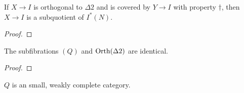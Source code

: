 \begin{thm}\label{thm:orth:seporth}
  If $X \to I$ is orthogonal to $\Delta 2$ and is covered by $Y \to I$
  with property $\dagger$, then $X \to I$ is a subquotient of
  $I^*(N)$.
\end{thm}
\begin{proof}
\end{proof}
\begin{thm}\label{defn:orth:seporth}
  The subfibrations $(Q)$ and $\operatorname{Orth}(\Delta 2)$ are identical.
\end{thm}
\begin{proof}
\end{proof}
\begin{cor}
  $Q$ is an small, weakly complete category.
\end{cor}
